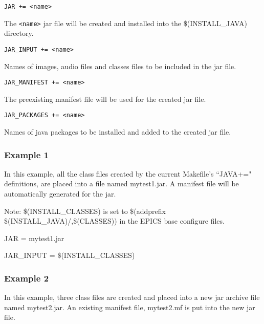 \begin{description}

\item {}\verb|JAR += <name>|

The \verb|<name>| jar file will be created and installed into the \$(INSTALL\_JAVA) directory.

\item {}\verb|JAR_INPUT += <name>|

Names of images, audio files and classes files to be included in the jar file.

\item {}\verb|JAR_MANIFEST += <name>|

The preexisting manifest file will be used for the created jar file.

\item \verb|JAR_PACKAGES += <name>|

Names of java packages to be installed and added to the created jar file.

\end{description}

\subsubsection{Example 1}

In this example, all the class files created by the current Makefile's ``JAVA+=" definitions, are placed into a file named 
mytest1.jar. A manifest file will be automatically generated for the jar. 

Note: \$(INSTALL\_CLASSES) is set to \$(addprefix \$(INSTALL\_JAVA)/,\$(CLASSES)) in the EPICS base configure 
files.

\begin{description}

\item {}JAR = mytest1.jar

\item {}JAR\_INPUT = \$(INSTALL\_CLASSES)

\end{description}

\subsubsection{Example 2}

In this example, three class files are created and placed into a new jar archive file named mytest2.jar. An existing manifest 
file, mytest2.mf is put into the new jar file.

